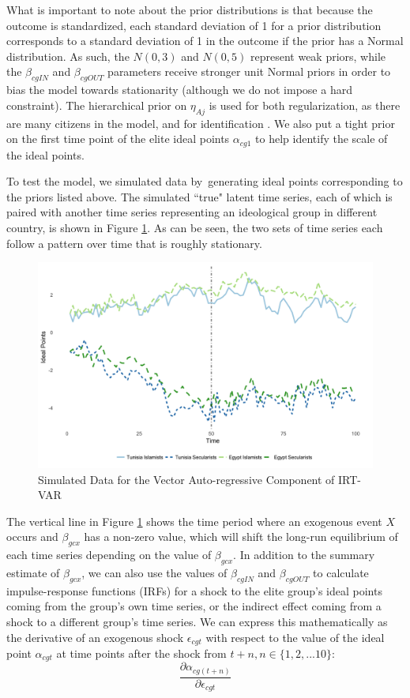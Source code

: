 \documentclass[12pt]{article}
\begin{document}
What is important to note about the prior distributions is that because the outcome is standardized, each standard deviation of 1 for a prior distribution corresponds to a standard deviation of 1 in the outcome if the prior has a Normal distribution. As such, the $N(0,3)$ and $N(0,5)$ represent weak priors, while the $\beta_{cgIN}$ and $\beta_{cgOUT}$ parameters receive stronger unit Normal priors in order to bias the model towards stationarity (although we do not impose a hard constraint). The hierarchical prior on $\eta_{Aj}$ is used for both regularization, as there are many citizens in the model, and for identification \parencite{gelman2005}. We also put a tight prior on the first time point of the elite ideal points $\alpha_{cg1}$ to help identify the scale of the ideal points.


 To test the model, we simulated data by generating ideal points corresponding to the priors listed above. The simulated ``true" latent time series, each of which is paired with another time series representing an ideological group in different country, is shown in Figure \ref{sim_data}. As can be seen, the two sets of time series each follow a pattern over time that is roughly stationary.
 \begin{figure}[!h]
 	\caption{Simulated Data for the Vector Auto-regressive Component of IRT-VAR}\label{sim_data}
 	\centering
	\includegraphics[width=.9\linewidth]{ecm_example.png}
 \end{figure}

The vertical line in Figure \ref{sim_data} shows the time period where an exogenous event $X$ occurs and $\beta_{gcx}$ has a non-zero value, which will shift the long-run equilibrium of each time series depending on the value of $\beta_{gcx}$. In addition to the summary estimate of $\beta_{gcx}$, we can also use the values of $\beta_{cgIN}$ and $\beta_{cgOUT}$ to calculate impulse-response functions (IRFs) for a shock to the elite group's ideal points coming from the group's own time series, or the indirect effect coming from a shock to a different group's time series. We can express this mathematically as the derivative of an exogenous shock $\epsilon_{cgt}$ with respect to the value of the ideal point $\alpha_{cgt}$ at time points after the shock from $t+n, n\in \{1,2,...10\}$:
\begin{equation}
\frac{\partial \alpha_{cg(t+n)}}{\partial \epsilon_{cgt}}
\end{equation}
\end{document}
